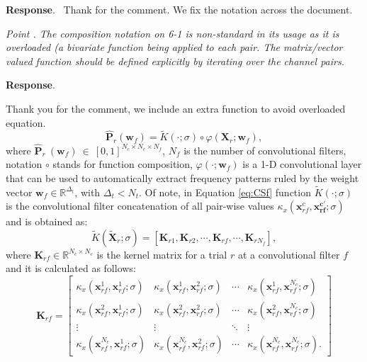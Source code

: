 \documentclass[runningheads]{llncs}
\newcommand{\Real}{\mathbb{R}}
\newcommand{\ve}[1]{\bm {#1}}
\newcommand{\mat}[1]{\bm {#1}}
\newenvironment{reviewer}{\setcounter{pointcounter}{1}}{}
\newcommand{\changes}[1]{\textcolor[rgb]{1.00,0.00,0.00}{#1}}
\newcommand{\point}[1]{\medskip \noindent
 \textsl{{\fontseries{b}\selectfont Point \thepointcounter}.
 \stepcounter{pointcounter} #1}}
\newcommand{\reply}{\medskip \noindent \textbf{Response}.\ }
\begin{document}
\begin{reviewer}
\reply{
    Thank for the comment. We fix the notation across the document.
}

\point{The composition notation on 6-1 is non-standard in its usage as it is overloaded (a bivariate function being applied to each pair. The matrix/vector valued function should be defined explicitly by iterating over the channel pairs. }

\reply{
    Thank you for the comment, we include an extra function to avoid overloaded equation.
    \changes{
        \begin{equation}\label{eq:CSf}
            \hat{\mat{P}}_{r}(\ve{w}_f)  = \tilde{K}(\cdot;\sigma) \circ \varphi(\mat{X}_r; \ve{w}_f), 
        \end{equation}
        where $\hat{\mat{P}}_{r}~(\ve{w}_f)~\in~[0,1]^{N_c\times N_c \times N_f}$, $N_f$ is the number of convolutional filters, notation $\circ$ stands for function composition, $\varphi(\cdot; \mat{w}_f)$ is a 1-D convolutional layer that can be used to automatically extract frequency patterns ruled by the weight vector $\ve{w}_f\in \Real^{\Delta_t}$, with $\Delta_t<N_t.$ Of note, in Equation \eqref{eq:CSf} function $\tilde{K}(\cdot;\sigma)$ is the convolutional filter concatenation of all pair-wise values $\kappa_{x}(\ve{x}^{c}_{rf},\ve{x^{c'}_{rf}}; \sigma)$ and is obtained as:
        \begin{equation}
            \tilde{K}(\mat{\tilde{X}}_r;\sigma) = \left[ \mat{K}_{r1} , \mat{K}_{r2}, \cdots,\mat{K}_{rf},\cdots, \mat{K}_{rN_f} \right],
        \end{equation}
        where $\mat{K}_{rf} \in \Real^{N_c \times N_c}$ is the kernel matrix for a trial $r$ at a convolutional filter $f$ and it is calculated as follows:
        \begin{equation}
            \mat{K}_{rf} = \begin{bmatrix}
                \kappa_{x}(\ve{x}^{1}_{rf}, \ve{x}^{1}_{rf}; \sigma) & \kappa_{x}(\ve{x}^{1}_{rf}, \ve{x}^{2}_{rf}; \sigma) & \cdots & \kappa_{x}(\ve{x}^{1}_{rf}, \ve{x}^{N_c}_{rf}; \sigma) \\
                \kappa_{x}(\ve{x}^{2}_{rf}, \ve{x}^{1}_{rf}; \sigma) & \kappa_{x}(\ve{x}^{2}_{rf}, \ve{x}^{2}_{rf}; \sigma) & \cdots & \kappa_{x}(\ve{x}^{2}_{rf}, \ve{x}^{N_c}_{rf}; \sigma) \\
                \vdots & \vdots & \ddots & \vdots \\
                \kappa_{x}(\ve{x}^{N_c}_{rf}, \ve{x}^{1}_{rf}; \sigma) & \kappa_{x}(\ve{x}^{N_c}_{rf}, \ve{x}^{2}_{rf}; \sigma) & \cdots & \kappa_{x}(\ve{x}^{N_c}_{rf}, \ve{x}^{N_c}_{rf}; \sigma).
            \end{bmatrix}
        \end{equation}
}

}
\end{reviewer}
\end{document}
